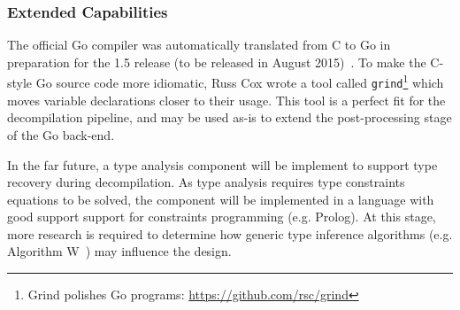 
\subsubsection{Extended Capabilities}
\label{sec:con_extended_capabilities}

The official Go compiler was automatically translated from C to Go in preparation for the 1.5 release (to be released in August 2015)~\cite{go_compiler_c2go}. To make the C-style Go source code more idiomatic, Russ Cox wrote a tool called \texttt{grind}\footnote{Grind polishes Go programs: \url{https://github.com/rsc/grind}} which moves variable declarations closer to their usage. This tool is a perfect fit for the decompilation pipeline, and may be used as-is to extend the post-processing stage of the Go back-end.

In the far future, a type analysis component will be implement to support type recovery during decompilation. As type analysis requires type constraints equations to be solved, the component will be implemented in a language with good support support for constraints programming (e.g. Prolog). At this stage, more research is required to determine how generic type inference algorithms (e.g. Algorithm W~\cite{algorithm_w}) may influence the design.
